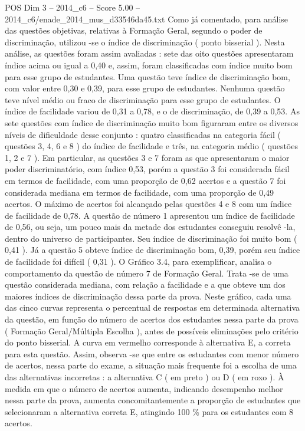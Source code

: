 \begin{textsample}{POS Dim 3 – 2014\_c6 – Score 5.00 – 2014\_c6/enade\_2014\_mus\_d33546da45.txt}
Como já comentado, para análise das questões objetivas, relativas à Formação Geral, segundo o poder de discriminação, utilizou -se o índice de discriminação ( ponto bisserial ).
Nesta análise, as questões foram assim avaliadas : sete das oito questões apresentaram índice acima ou igual a 0,40 e, assim, foram classificadas com índice muito bom para esse grupo de estudantes.
Uma questão teve índice de discriminação bom, com valor entre 0,30 e 0,39, para esse grupo de estudantes.
Nenhuma questão teve nível médio ou fraco de discriminação para esse grupo de estudantes.
O índice de facilidade variou de 0,31 a 0,78, e o de discriminação, de 0,39 a 0,53.
As sete questões com índice de discriminação muito bom figuraram entre os diversos níveis de dificuldade desse conjunto : quatro classificadas na categoria fácil ( questões 3, 4, 6 e 8 ) do índice de facilidade e três, na categoria médio ( questões 1, 2 e 7 ).
Em particular, as questões 3 e 7 foram as que apresentaram o maior poder discriminatório, com índice 0,53, porém a questão 3 foi considerada fácil em termos de facilidade, com uma proporção de 0,62 acertos e a questão 7 foi considerada mediana em termos de facilidade, com uma proporção de 0,49 acertos.
O máximo de acertos foi alcançado pelas questões 4 e 8 com um índice de facilidade de 0,78.
A questão de número 1 apresentou um índice de facilidade de 0,56, ou seja, um pouco mais da metade dos estudantes conseguiu resolvê -la, dentro do universo de participantes.
Seu índice de discriminação foi muito bom ( 0,41 ).
Já a questão 5 obteve índice de discriminação bom, 0,39, porém seu índice de facilidade foi difícil ( 0,31 ).
O Gráfico 3.4, para exemplificar, analisa o comportamento da questão de número 7 de Formação Geral.
Trata -se de uma questão considerada mediana, com relação a facilidade e a que obteve um dos maiores índices de discriminação dessa parte da prova.
Neste gráfico, cada uma das cinco curvas representa o percentual de respostas em determinada alternativa da questão, em função do número de acertos dos estudantes nessa parte da prova ( Formação Geral/Múltipla Escolha ), antes de possíveis eliminações pelo critério do ponto bisserial.
A curva em vermelho corresponde à alternativa E, a correta para esta questão.
Assim, observa -se que entre os estudantes com menor número de acertos, nessa parte do exame, a situação mais frequente foi a escolha de uma das alternativas incorretas : a alternativa C ( em preto ) ou D ( em roxo ).
À medida em que o número de acertos aumenta, indicando desempenho melhor nessa parte da prova, aumenta concomitantemente a proporção de estudantes que selecionaram a alternativa correta E, atingindo 100 \% para os estudantes com 8 acertos.

\end{textsample}
